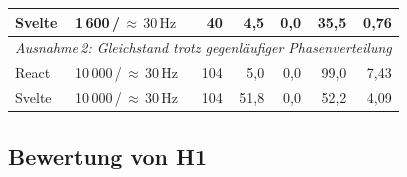 \begin{table}[H]
\begin{tabular}{llrrrrr}
    Svelte & 1\,600\,/\,${\approx}\,30\,\text{Hz}$
      & 40  & 4{,}5  & 0{,}0 & 35{,}5 & 0{,}76 \\
    \midrule
    \multicolumn{7}{l}{\textit{Ausnahme\,2: Gleichstand trotz gegenläufiger Phasenverteilung}} \\
    React  & 10\,000\,/\,${\approx}\,30\,\text{Hz}$
      & 104 & 5{,}0  & 0{,}0 & 99{,}0 & 7{,}43 \\
    Svelte & 10\,000\,/\,${\approx}\,30\,\text{Hz}$
      & 104 & 51{,}8 & 0{,}0 & 52{,}2 & 4{,}09 \\
    \bottomrule
  \end{tabular}
\end{table}

\subsection{Bewertung von H1}
\label{ss:results-h1-verdict}

